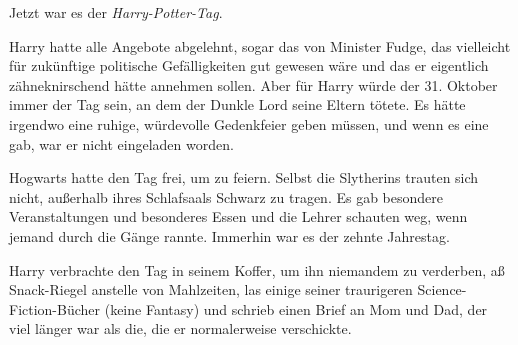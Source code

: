 Jetzt war es der \emph{Harry-Potter-Tag}.

Harry hatte alle Angebote abgelehnt, sogar das von Minister Fudge, das
vielleicht für zukünftige politische Gefälligkeiten gut gewesen wäre und das er
eigentlich zähneknirschend hätte annehmen sollen. Aber für Harry würde der 31.
Oktober immer der Tag sein, an dem der Dunkle Lord seine Eltern tötete. Es hätte
irgendwo eine ruhige, würdevolle Gedenkfeier geben müssen, und wenn es eine gab,
war er nicht eingeladen worden.

Hogwarts hatte den Tag frei, um zu feiern. Selbst die Slytherins trauten sich
nicht, außerhalb ihres Schlafsaals Schwarz zu tragen. Es gab besondere
Veranstaltungen und besonderes Essen und die Lehrer schauten weg, wenn jemand
durch die Gänge rannte. Immerhin war es der zehnte Jahrestag.

Harry verbrachte den Tag in seinem Koffer, um ihn niemandem zu verderben, aß
Snack-Riegel anstelle von Mahlzeiten, las einige seiner traurigeren
Science-Fiction-Bücher (keine Fantasy) und schrieb einen Brief an Mom und Dad,
der viel länger war als die, die er normalerweise verschickte.
